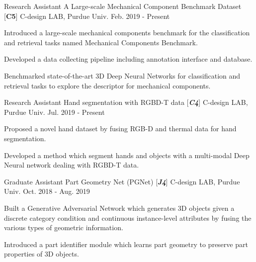 

\begin{cventries}

\cventry
{Research Assistant} %
{A Large-scale Mechanical Component Benchmark Dataset [\textbf{C5}]} %
{C-design LAB, Purdue Univ.} %
{Feb. 2019 - Present} %
{ %
\begin{cvitems}
\item {Introduced a large-scale mechanical components benchmark for the classification and retrieval tasks named Mechanical Components Benchmark.}
\item {Developed a data collecting pipeline including annotation interface and database.}
\item {Benchmarked state-of-the-art 3D Deep Neural Networks for classification and retrieval tasks to explore the descriptor for mechanical components.}
\end{cvitems}
}
\cventry
{Research Assistant} %
{Hand segmentation with RGBD-T data [\textit{\textbf{C4}}]} %
{C-design LAB, Purdue Univ.} %
{Jul. 2019 - Present} %
{ %
\begin{cvitems}
\item {Proposed a novel hand dataset by fusing RGB-D and thermal data for hand segmentation.}
\item {Developed a method which segment hands and objects with a multi-modal Deep Neural network dealing with RGBD-T data.}
\end{cvitems}
}


\cventry
{Graduate Assistant} %
{Part Geometry Net (PGNet) [\textit{\textbf{J4}}]} %
{C-design LAB, Purdue Univ.} %
{Oct. 2018 - Aug. 2019} %
{ %
\begin{cvitems}
\item {Built a Generative Adversarial Network which generates 3D objects given a discrete category condition and continuous instance-level attributes by fusing the various types of geometric information.}
\item {Introduced a part identifier module which learns part geometry to preserve part properties of 3D objects.}
\end{cvitems}
}


\end{cventries}
